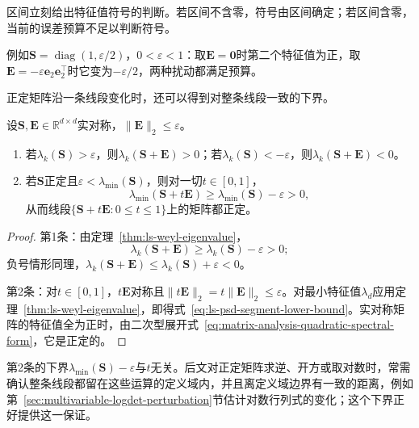 区间立刻给出特征值符号的判断。若区间不含零，符号由区间确定；若区间含零，当前的误差预算不足以判断符号。

例如$\bm S=\operatorname{diag}(1,\varepsilon/2)$，$0<\varepsilon<1$：取$\bm E=\bm0$时第二个特征值为正，取$\bm E=-\varepsilon\bm e_2\bm e_2^\top$时它变为$-\varepsilon/2$，两种扰动都满足预算。

正定矩阵沿一条线段变化时，还可以得到对整条线段一致的下界。
\begin{theorem}[特征值的符号与正定性保持]
\label{thm:ls-eigenvalue-sign-definiteness}
设$\bm S,\bm E\in\mathbb R^{d\times d}$实对称，$\lVert\bm E\rVert_2\leq\varepsilon$。
\begin{enumerate}
 \item 若$\lambda_k(\bm S)>\varepsilon$，则$\lambda_k(\bm S+\bm E)>0$；若$\lambda_k(\bm S)<-\varepsilon$，则$\lambda_k(\bm S+\bm E)<0$。
 \item 若$\bm S$正定且$\varepsilon<\lambda_{\min}(\bm S)$，则对一切$t\in[0,1]$，
 \begin{equation}
  \lambda_{\min}(\bm S+t\bm E)\geq\lambda_{\min}(\bm S)-\varepsilon>0 ,
  \label{eq:ls-psd-segment-lower-bound}
 \end{equation}
 从而线段$\{\bm S+t\bm E:0\leq t\leq1\}$上的矩阵都正定。
\end{enumerate}
\end{theorem}
\begin{proof}
第1条：由定理~\ref{thm:ls-weyl-eigenvalue}，
\[
 \lambda_k(\bm S+\bm E)\geq\lambda_k(\bm S)-\varepsilon>0 ;
\]
负号情形同理，$\lambda_k(\bm S+\bm E)\leq\lambda_k(\bm S)+\varepsilon<0$。

第2条：对$t\in[0,1]$，$t\bm E$对称且$\lVert t\bm E\rVert_2=t\lVert\bm E\rVert_2\leq\varepsilon$。对最小特征值$\lambda_d$应用定理~\ref{thm:ls-weyl-eigenvalue}，即得式~\eqref{eq:ls-psd-segment-lower-bound}。实对称矩阵的特征值全为正时，由二次型展开式~\eqref{eq:matrix-analysis-quadratic-spectral-form}，它是正定的。
\end{proof}
第2条的下界$\lambda_{\min}(\bm S)-\varepsilon$与$t$无关。后文对正定矩阵求逆、开方或取对数时，常需确认整条线段都留在这些运算的定义域内，并且离定义域边界有一致的距离，例如第~\ref{sec:multivariable-logdet-perturbation}节估计对数行列式的变化；这个下界正好提供这一保证。

